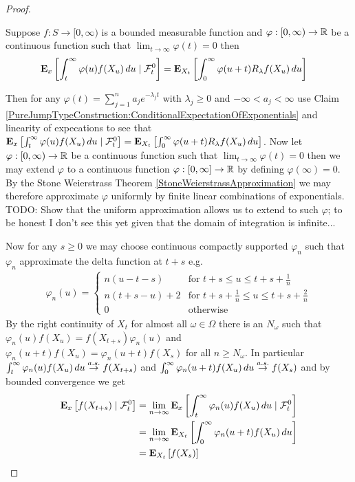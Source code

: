 \begin{proof}
\begin{clm}Suppose $f : S \to [0,\infty)$ is a bounded measurable function and $\varphi : [0,\infty) \to \reals$ be a continuous function such that $\lim_{t \to \infty} \varphi(t) = 0$ then
\begin{align*}
\csexpectationlong{\mathcal{F}^0_t}{\int_t^\infty \varphi(u) f(X_u) \, du}{x} 
&= \sexpectation{\int_0^\infty \varphi(u+t) R_\lambda f(X_u) \, du}{X_t}
\end{align*}
\end{clm}
Then for any $\varphi(t) = \sum_{j=1}^n a_j e^{-\lambda_j t}$ with $\lambda_j \geq 0$ and $-\infty < a_j < \infty$ use Claim \ref{PureJumpTypeConstruction:ConditionalExpectationOfExponentials}  and linearity of expecations to see that $\csexpectationlong{\mathcal{F}^0_t}{\int_t^\infty \varphi(u) f(X_u) \, du}{x} = \sexpectation{\int_0^\infty \varphi(u+t) R_\lambda f(X_u) \, du}{X_t}$.  Now let $\varphi : [0,\infty) \to \reals$ be a continuous function such that $\lim_{t \to \infty} \varphi(t) = 0$ then we may extend $\varphi$ to a continuous function $\varphi : [0,\infty] \to \reals$ by defining $\varphi(\infty) = 0$.  By the Stone Weierstrass Theorem \ref{StoneWeierstrassApproximation} 
we may therefore approximate $\varphi$ uniformly by finite linear combinations of exponentials.  TODO: Show that the uniform approximation allows us to extend to such $\varphi$; to be honest I don't see this yet given that the domain of integration is infinite...

Now for any $s \geq 0$ we may choose continuous compactly supported $\varphi_n$ such that $\varphi_n$ approximate the delta function at $t+s$ e.g.
\begin{align*}
\varphi_n(u) = 
\begin{cases}
n(u - t - s) & \text{for $t+s \leq u \leq t+s+ \frac{1}{n}$} \\
n(t+s - u) + 2 & \text{for $t+s+ \frac{1}{n} \leq u \leq t+ s+ \frac{2}{n}$} \\
0 & \text{otherwise}
\end{cases}
\end{align*}
By the right continuity of $X_t$ for almost all $\omega \in \Omega$ there is an $N_\omega$ such that $\varphi_n(u) f(X_u) = f(X_{t+s}) \varphi_n(u)$ and $\varphi_n(u+t) f(X_u) = \varphi_n(u+t) f(X_s)$ for all $n \geq N_\omega$.  In particular $\int_t^\infty \varphi_n(u) f(X_u) \, du \toas f(X_{t+s})$  and $\int_0^\infty \varphi_n(u+t) f(X_u) \, du \toas f(X_s)$ and by bounded 
convergence we get
\begin{align*}
\csexpectationlong{\mathcal{F}^0_t}{f(X_{t+s})}{x} 
&=\lim_{n \to \infty} \csexpectationlong{\mathcal{F}^0_t}{\int_t^\infty \varphi_n(u) f(X_u) \, du}{x} \\
&=\lim_{n \to \infty} \sexpectation{\int_0^\infty \varphi_n(u+t) f(X_u) \, du}{X_t} \\
&=\sexpectation{f(X_s)}{X_t} \\
\end{align*}


\end{proof}
